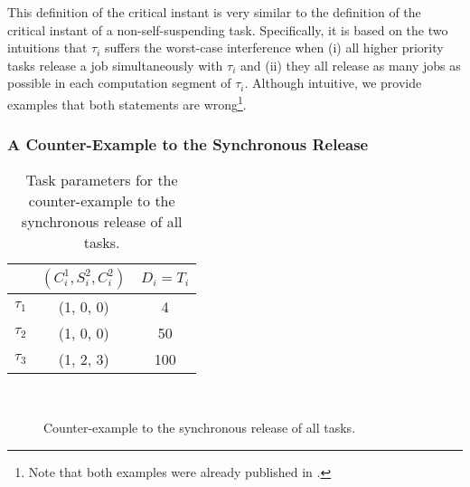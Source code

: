 This definition of the critical instant is very similar to the definition of the critical instant of a non-self-suspending task. Specifically, it is based on the two intuitions that $\tau_i$ suffers the worst-case interference when (i) all higher priority tasks release a job simultaneously with $\tau_i$ and (ii) they all release as many jobs as possible in each computation segment of $\tau_i$. Although intuitive, we provide examples that both statements are wrong\footnote{Note that both examples were already published in \cite{ecrts15nelissen}.}.

\subsubsection{A Counter-Example to the Synchronous Release}

\begin{table} 
\centering
    \begin{tabular}{|c|c|c|}
 \hline
        & $(C_i^1, S_i^2, C_i^2)$ &  $D_i=T_i$\\ 
        \hline
        $\tau_1$ & (1, 0, 0) &  4\\ 
        $\tau_2$ &  (1, 0, 0) & 50  \\ 
        $\tau_3$ & (1, 2, 3) & 100  
        \hline
    \end{tabular} 
    \caption{Task parameters for the counter-example to the synchronous release of all tasks.}
    \label{table:ex-synch-releases}
\end{table}

\begin{figure}
  \centering
   \\
  \caption{Counter-example to the synchronous release of all tasks.}
  \label{fig:ex-synch-releases}
\end{figure}

